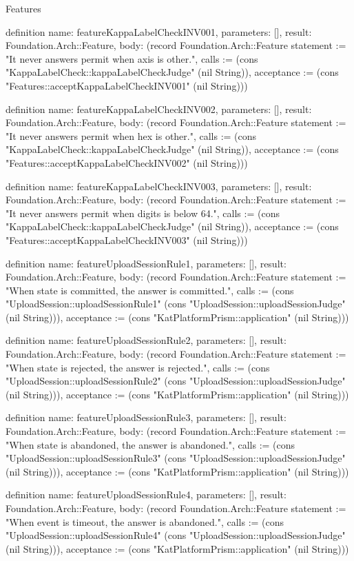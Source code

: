 \begin{lexlean}{Features}
\begin{semanticmodule}
definition{
  name: featureKappaLabelCheckINV001,
  parameters: [],
  result: Foundation.Arch::Feature,
  body: (record Foundation.Arch::Feature {statement := "It never answers permit when axis is other.", calls := (cons "KappaLabelCheck::kappaLabelCheckJudge" (nil String)), acceptance := (cons "Features::acceptKappaLabelCheckINV001" (nil String))})
}

definition{
  name: featureKappaLabelCheckINV002,
  parameters: [],
  result: Foundation.Arch::Feature,
  body: (record Foundation.Arch::Feature {statement := "It never answers permit when hex is other.", calls := (cons "KappaLabelCheck::kappaLabelCheckJudge" (nil String)), acceptance := (cons "Features::acceptKappaLabelCheckINV002" (nil String))})
}

definition{
  name: featureKappaLabelCheckINV003,
  parameters: [],
  result: Foundation.Arch::Feature,
  body: (record Foundation.Arch::Feature {statement := "It never answers permit when digits is below 64.", calls := (cons "KappaLabelCheck::kappaLabelCheckJudge" (nil String)), acceptance := (cons "Features::acceptKappaLabelCheckINV003" (nil String))})
}

definition{
  name: featureUploadSessionRule1,
  parameters: [],
  result: Foundation.Arch::Feature,
  body: (record Foundation.Arch::Feature {statement := "When state is committed, the answer is committed.", calls := (cons "UploadSession::uploadSessionRule1" (cons "UploadSession::uploadSessionJudge" (nil String))), acceptance := (cons "KatPlatformPrism::application" (nil String))})
}

definition{
  name: featureUploadSessionRule2,
  parameters: [],
  result: Foundation.Arch::Feature,
  body: (record Foundation.Arch::Feature {statement := "When state is rejected, the answer is rejected.", calls := (cons "UploadSession::uploadSessionRule2" (cons "UploadSession::uploadSessionJudge" (nil String))), acceptance := (cons "KatPlatformPrism::application" (nil String))})
}

definition{
  name: featureUploadSessionRule3,
  parameters: [],
  result: Foundation.Arch::Feature,
  body: (record Foundation.Arch::Feature {statement := "When state is abandoned, the answer is abandoned.", calls := (cons "UploadSession::uploadSessionRule3" (cons "UploadSession::uploadSessionJudge" (nil String))), acceptance := (cons "KatPlatformPrism::application" (nil String))})
}

definition{
  name: featureUploadSessionRule4,
  parameters: [],
  result: Foundation.Arch::Feature,
  body: (record Foundation.Arch::Feature {statement := "When event is timeout, the answer is abandoned.", calls := (cons "UploadSession::uploadSessionRule4" (cons "UploadSession::uploadSessionJudge" (nil String))), acceptance := (cons "KatPlatformPrism::application" (nil String))})
}


\end{semanticmodule}
\end{lexlean}
